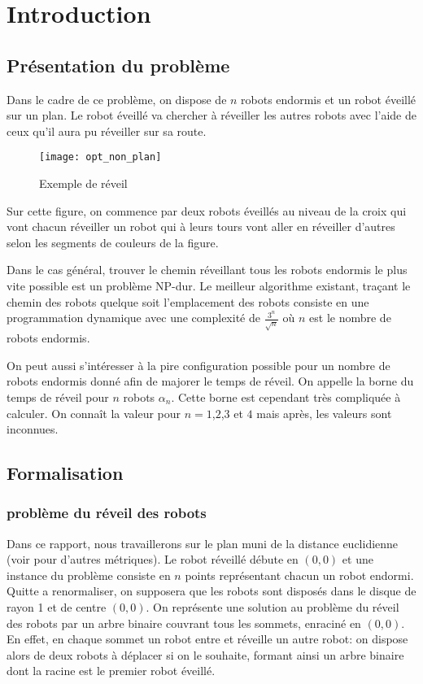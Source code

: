 \section{Introduction}

\subsection{Présentation du problème}

Dans le cadre de ce problème, on dispose de $n$ robots endormis et un robot éveillé sur un plan. Le robot éveillé va chercher à réveiller les autres robots avec l'aide de ceux qu'il aura pu réveiller sur sa route.

\begin{figure}[h!]
  \centering
  \texttt{[image: opt\_non\_plan]}
  \caption{Exemple de réveil}
  \label{fig:opt_non_plan}
\end{figure}

Sur cette figure, on commence par deux robots éveillés au niveau de la croix qui vont chacun réveiller un robot qui à leurs tours vont aller en réveiller d'autres selon les segments de couleurs de la figure.

Dans le cas général, trouver le chemin réveillant tous les robots endormis le plus vite possible est un problème NP-dur. Le meilleur algorithme existant, traçant le chemin des robots quelque soit l'emplacement des robots consiste en une programmation dynamique avec une complexité de $\frac{3^n}{\sqrt{n}}$ où $n$ est le nombre de robots endormis.

On peut aussi s'intéresser à la pire configuration possible pour un nombre de robots endormis donné afin de majorer le temps de réveil. On appelle la borne du temps de réveil pour $n$ robots $\alpha_n$. Cette borne est cependant très compliquée à calculer. On connaît la valeur pour $n = 1$,$2$,$3$ et $4$ mais après, les valeurs sont inconnues.

\subsection{Formalisation}

\subsubsection{problème du réveil des robots}

Dans ce rapport, nous travaillerons sur le plan muni de la distance
euclidienne (voir \cite{} pour d'autres métriques). Le robot réveillé débute en
$(0,0)$ et une instance du problème consiste en $n$ points représentant chacun
un robot endormi. Quitte a renormaliser, on supposera que les robots sont
disposés dans le disque de rayon 1 et de centre $(0,0)$. On représente une
solution au problème du réveil des robots par un arbre binaire couvrant tous les
sommets, enraciné en $(0, 0)$. En effet, en chaque sommet un robot entre et
réveille un autre robot: on dispose alors de deux robots à déplacer si on le
souhaite, formant ainsi un arbre binaire dont la racine est le premier robot
éveillé.

